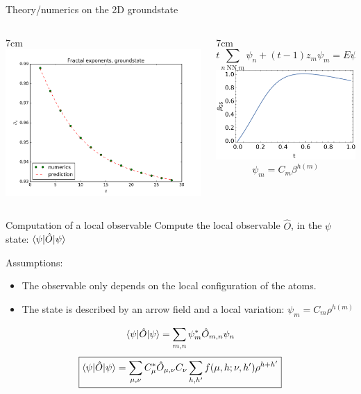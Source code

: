\documentclass[xcolor=x11names,compress,professionalfonts, aspectratio=169]{beamer}
\renewcommand{\(}{\begin{columns}}
\renewcommand{\)}{\end{columns}}
\newcommand{\<}[1]{\begin{column}{#1}}
\renewcommand{\>}{\end{column}}
\begin{document}
\begin{frame}{Theory/numerics on the 2D groundstate}
\begin{columns}
\<{7cm}
\centering
\includegraphics[scale=.4]{img/fractal_exponents_groundstate.png}
\>
\<{7cm}
\[
	t \sum_{n ~\text{NN}~m} \psi_n + (t-1)z_m \psi_m = E \psi_m
\]
\centering
\includegraphics[scale=.6]{img/beta_t.pdf}
\[
	\psi_m = C_m \beta^{h(m)}
\]
\>
\end{columns}
\end{frame}

\begin{frame}{Computation of a local observable}
Compute the local observable $\hat{O}$, in the $\psi$ state: $\braket{\psi | \hat{O} | \psi}$

Assumptions:
\begin{itemize}
	\item The observable only depends on the local configuration of the atoms.
	\item The state is described by an arrow field and a local variation: $\psi_m = C_m \rho^{h(m)}$
\end{itemize}
\[
	\braket{\psi | \hat{O} | \psi} = \sum_{m,n} \psi_m^* \hat{O}_{m,n} \psi_n
\]
\[
\boxed{\braket{\psi | \hat{O} | \psi} = \sum_{\mu, \nu}C_{\mu}^* \hat{O}_{\mu,\nu} C_{\nu} \sum_{h,h'} f(\mu, h; \nu, h') \rho^{h+h'}}
\]
\end{frame}
\end{document}
